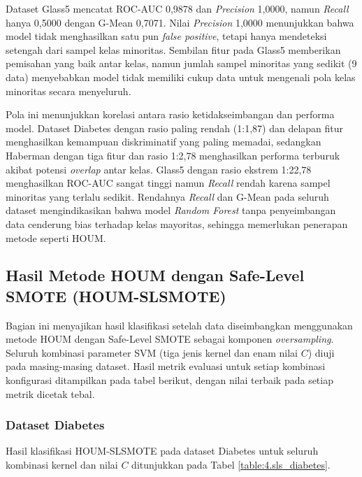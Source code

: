 Dataset Glass5 mencatat ROC-AUC 0,9878 dan \textit{Precision} 1,0000, namun \textit{Recall} hanya 0,5000 dengan G-Mean 0,7071. Nilai \textit{Precision} 1,0000 menunjukkan bahwa model tidak menghasilkan satu pun \textit{false positive}, tetapi hanya mendeteksi setengah dari sampel kelas minoritas. Sembilan fitur pada Glass5 memberikan pemisahan yang baik antar kelas, namun jumlah sampel minoritas yang sedikit (9 data) menyebabkan model tidak memiliki cukup data untuk mengenali pola kelas minoritas secara menyeluruh. \par

Pola ini menunjukkan korelasi antara rasio ketidakseimbangan dan performa model. Dataset Diabetes dengan rasio paling rendah (1:1,87) dan delapan fitur menghasilkan kemampuan diskriminatif yang paling memadai, sedangkan Haberman dengan tiga fitur dan rasio 1:2,78 menghasilkan performa terburuk akibat potensi \textit{overlap} antar kelas. Glass5 dengan rasio ekstrem 1:22,78 menghasilkan ROC-AUC sangat tinggi namun \textit{Recall} rendah karena sampel minoritas yang terlalu sedikit. Rendahnya \textit{Recall} dan G-Mean pada seluruh dataset mengindikasikan bahwa model \textit{Random Forest} tanpa penyeimbangan data cenderung bias terhadap kelas mayoritas, sehingga memerlukan penerapan metode seperti HOUM.

\subsection{Hasil Metode HOUM dengan Safe-Level SMOTE (HOUM-SLSMOTE)} \label{IV.HOUM_SLS}
Bagian ini menyajikan hasil klasifikasi setelah data diseimbangkan menggunakan metode HOUM dengan Safe-Level SMOTE sebagai komponen \textit{oversampling}. Seluruh kombinasi parameter SVM (tiga jenis kernel dan enam nilai $C$) diuji pada masing-masing dataset. Hasil metrik evaluasi untuk setiap kombinasi konfigurasi ditampilkan pada tabel berikut, dengan nilai terbaik pada setiap metrik dicetak tebal.

\subsubsection{Dataset Diabetes} \label{IV.SLS_Diabetes}
Hasil klasifikasi HOUM-SLSMOTE pada dataset Diabetes untuk seluruh kombinasi kernel dan nilai $C$ ditunjukkan pada Tabel \ref{table:4.sls_diabetes}.

